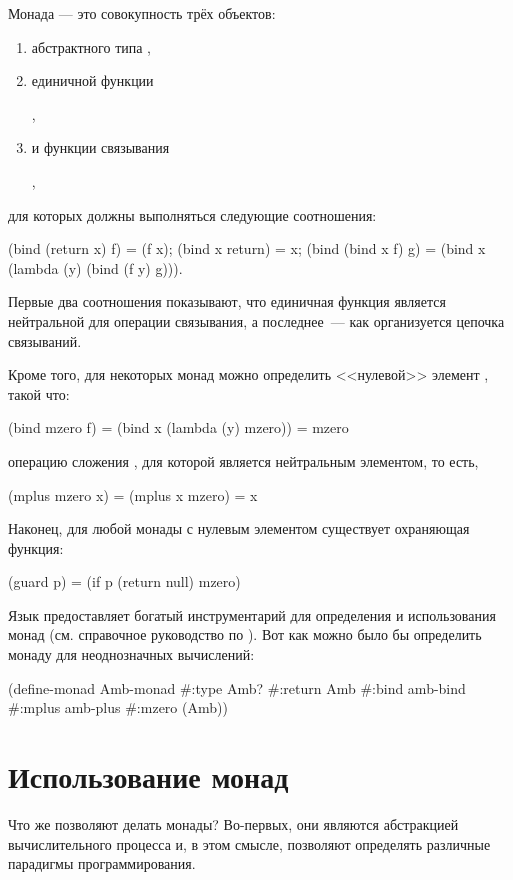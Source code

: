 Монада --- это совокупность трёх объектов:
\begin{enumerate}
  \item абстрактного типа ,
  \item единичной функции 
  \begin{center}
  ,
  \end{center}
  \item и функции связывания 
  \begin{center}
  ,
  \end{center}
\end{enumerate}
для которых должны выполняться следующие соотношения:
\begin{SchemeCode}[emph={f,x,y,g}]
  (bind (return x) f) = (f x);
  (bind x return) = x;
  (bind (bind x f) g) = (bind x (lambda (y) (bind (f y) g))).
\end{SchemeCode}
Первые два соотношения показывают, что единичная функция является нейтральной для операции связывания, а последнее~--- как организуется цепочка связываний.

Кроме того, для некоторых монад можно определить <<нулевой>> элемент , такой что:

\begin{SchemeCode}[emph={f,x,y}]
  (bind mzero f) = (bind x (lambda (y) mzero)) = mzero
\end{SchemeCode}
 операцию сложения , для которой  является нейтральным элементом, то есть,
\begin{SchemeCode}
  (mplus mzero x) = (mplus x mzero) = x
\end{SchemeCode}

Наконец, для любой монады с нулевым элементом существует охраняющая функция:

\begin{SchemeCode}[emph={p}]
  (guard p) = (if p (return null) mzero)
\end{SchemeCode}

Язык \Scheme предоставляет богатый инструментарий для определения и использования монад (см. справочное руководство по \Scheme). Вот как можно было бы определить монаду для неоднозначных вычислений:
\begin{SchemeCode}
(define-monad Amb-monad
  #:type Amb?
  #:return Amb
  #:bind amb-bind
  #:mplus amb-plus
  #:mzero (Amb))
\end{SchemeCode}

\section[2]{Использование монад}%
Что же позволяют делать монады? Во-первых, они являются абстракцией вычислительного процесса и, в этом смысле, позволяют определять различные парадигмы программирования. 

